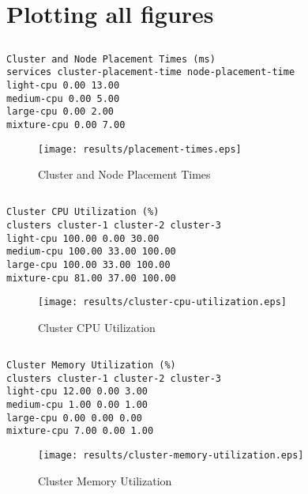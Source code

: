 \documentclass{elsart}
\begin{document}
\section{Plotting all figures}
\subsection{}

\begin{lstlisting}[caption={Cluster and Node Placement Times}]
Cluster and Node Placement Times (ms)
services cluster-placement-time node-placement-time
light-cpu 0.00 13.00
medium-cpu 0.00 5.00
large-cpu 0.00 2.00
mixture-cpu 0.00 7.00
\end{lstlisting}

\begin{figure}[ht]
\centering
\texttt{[image: results/placement-times.eps]}
\caption{Cluster and Node Placement Times}\label{fig:placement-times.eps}
\end{figure}

\subsection{}

\begin{lstlisting}[caption={Cluster CPU Utilization}]
Cluster CPU Utilization (%)
clusters cluster-1 cluster-2 cluster-3
light-cpu 100.00 0.00 30.00
medium-cpu 100.00 33.00 100.00
large-cpu 100.00 33.00 100.00
mixture-cpu 81.00 37.00 100.00
\end{lstlisting}

\begin{figure}[ht]
\centering
\texttt{[image: results/cluster-cpu-utilization.eps]}
\caption{Cluster CPU Utilization}\label{fig:cluster-cpu-utilization.eps}
\end{figure}

\subsection{}

\begin{lstlisting}[caption={Cluster Memory Utilization}]
Cluster Memory Utilization (%)
clusters cluster-1 cluster-2 cluster-3
light-cpu 12.00 0.00 3.00
medium-cpu 1.00 0.00 1.00
large-cpu 0.00 0.00 0.00
mixture-cpu 7.00 0.00 1.00
\end{lstlisting}

\begin{figure}[ht]
\centering
\texttt{[image: results/cluster-memory-utilization.eps]}
\caption{Cluster Memory Utilization}\label{fig:cluster-memory-utilization.eps}
\end{figure}
\end{document}
